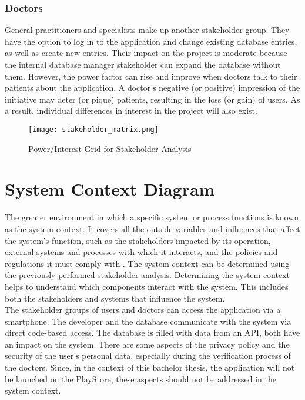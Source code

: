 \subsubsection{Doctors}
General practitioners and specialists make up another stakeholder group. They have the option to log in to the application and change existing database entries, as well as create new entries. Their impact on the project is moderate because the internal database manager stakeholder can expand the database without them. However, the power factor can rise and improve when doctors talk to their patients about the application. A doctor's negative (or positive) impression of the initiative may deter (or pique) patients, resulting in the loss (or gain) of users. As a result, individual differences in interest in the project will also exist.

\begin{figure}[H]
	\centering
	\texttt{[image: stakeholder\_matrix.png]}
	\caption[Power/Interest Grid for Stakeholder-Analysis ]{Power/Interest Grid for Stakeholder-Analysis}
\end{figure}	

\section{System Context Diagram}
The greater environment in which a specific system or process functions is known as the system context. It covers all the outside variables and influences that affect the system's function, such as the stakeholders impacted by its operation, external systems and processes with which it interacts, and the policies and regulations it must comply with \cite{.systemcontext}. The system context can be determined using the previously performed stakeholder analysis. Determining the system context helps to understand which components interact with the system. This includes both the stakeholders and systems that influence the system.
\newline \\
The stakeholder groups of users and doctors can access the application via a smartphone. The developer and the database communicate with the system via direct code-based access. The database is filled with data from an API, both have an impact on the system. There are some aspects of the privacy policy and the security of the user's personal data, especially during the verification process of the doctors. Since, in the context of this bachelor thesis, the application will not be launched on the PlayStore, these aspects should not be addressed in the system context.

